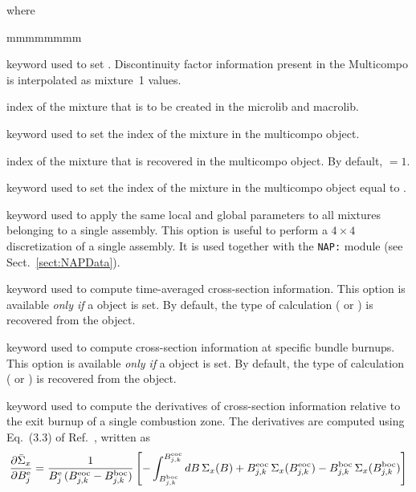 \noindent where
\begin{ListeDeDescription}{mmmmmmmm}

\item[\moc{MIX}] keyword used to set . Discontinuity factor information present in the Multicompo is interpolated as mixture~1 values.

\item[\dusa{imix}] index of the mixture that is to be created in the {\sc microlib} and {\sc macrolib}.

\item[\moc{FROM}] keyword used to set the index of the mixture in the {\sc multicompo} object.

\item[\dusa{imixold}] index of the mixture that is recovered in the {\sc multicompo} object. By default, $=1$.

\item[\moc{USE}] keyword used to set the index of the mixture in the {\sc multicompo} object equal to .

\item[\moc{ASBLY}] keyword used to apply the same local and global parameters to all mixtures belonging to a single assembly. This option is
useful to perform a $4 \times 4$ discretization of a single assembly. It is used together with the {\tt NAP:} module (see Sect.~\ref{sect:NAPData}).

\item[\moc{TIMAV-BURN}] keyword used to compute time-averaged cross-section information. This option is available {\sl only if} a  object is set.
By default, the type of calculation ( or ) is recovered from the  object.

\item[\moc{INST-BURN}] keyword used to compute cross-section information at specific bundle burnups. This option is available {\sl only if} a  object is set.
By default, the type of calculation ( or ) is recovered from the  object.

\item[\moc{AVG-EX-BURN}] keyword used to compute the derivatives of cross-section information relative to the exit burnup of a single combustion zone. The derivatives are computed using Eq.~(3.3) of Ref.~, written as
$$
{\partial \bar\Sigma_x\over \partial B_j^{\rm e}}={1\over B_j^{\rm e}\, (B_{j,k}^{\rm eoc}-B_{j,k}^{\rm boc})}
\left[- \int_{B_{j,k}^{\rm boc}}^{B_{j,k}^{\rm eoc}}dB \, \Sigma_x(B)+B_{j,k}^{\rm eoc}\, \Sigma_x(B_{j,k}^{\rm eoc})-B_{j,k}^{\rm boc}\, \Sigma_x(B_{j,k}^{\rm boc})\right]
$$


\end{ListeDeDescription}
